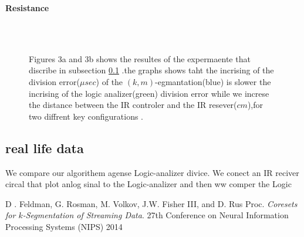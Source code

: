 \documentclass{vldb}
\begin{document}
\textbf{Resistance}

\begin{figure}[H]
\centering
{}  \\
\\

\caption{Figures 3a and 3b shows the resultes of the expermaente that discribe in subsection \ref{IR} .the graphs shows taht the incrising of the division error($\mu sec$) of the $(k,m)$-egmantation(blue) is slower  the incrising of the logic analizer(green) division error while we increse the distance between the IR controler and the IR resever($cm$),for two diffrent key configurations .}
\end{figure}
\subsection{real life data}\label{IR}
We compare our algorithem agense Logic-analizer divice. We conect an IR reciver circal that plot anlog sinal to the Logic-analizer and then ww comper the Logic 
\medskip

\begin{thebibliography}{9}
D . Feldman, G. Rosman, M. Volkov, J.W. Fisher III, and D. Rus
Proc. 
\textit{Coresets for $k$-Segmentation of Streaming Data}. 
27th Conference on Neural Information Processing Systems (NIPS) 2014
 
\end{thebibliography}
\end{document}
